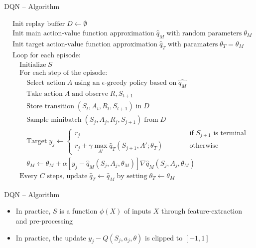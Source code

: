 \documentclass[ignorenonframetext,xcolor=x11names]{beamer}
\begin{document}
\begin{frame}{DQN -- Algorithm}
\footnotesize
\begin{block}{}
\vspace{-\baselineskip}
\begin{align*}
& \text{Init replay buffer}\;D \leftarrow \emptyset \\
& \text{Init main action-value function approximation}\;\hat{q}_M\;\text{with random parameters}\;\theta_M \\
& \text{Init target action-value function approximation}\;\hat{q}_T\;\text{with paramaters}\;\theta_T=\theta_M \\
& \text{Loop for each episode:}\\
& \quad \text{Initialize}\;S \\
& \quad \text{For each step of the episode:} \\
& \quad \quad \text{Select action}\; A \; \text{using an} \; \text{$\epsilon$-greedy policy based on}\; \hat{q_M}\\
& \quad \quad \text{Take action} \; A \; \text{and observe}\;R, S_{t+1} \\
& \quad \quad \text{Store transition} \; (S_t , A_t , R_t , S_{t+1} ) \; \text{in} \; D \\
& \quad \quad \text{Sample minibatch} \; (S_j , A_j , R_j , S_{j+1} ) \; \text{from} \; D \\
& \quad \quad \text{Target}\;y_j \leftarrow \begin{cases} r_j & \qquad \quad \text{if $S_{j+1}$ is terminal} \\
r_j + \gamma \max_{A'} \hat{q}_T(S_{j+1}, A'; \theta_T) & \qquad \quad \text{otherwise}\end{cases} \\
& \quad \quad \theta_M \leftarrow \theta_M + \alpha [y_j - \hat{q}_M (S_j, A_j, \theta_M)] \nabla \hat{q}_M(S_j, A_j, \theta_M) \hspace{1in} \\
& \quad \text{Every $C$ steps, update}\; \hat{q}_T \leftarrow \hat{q}_M\;\text{by setting}\; \theta_T \leftarrow \theta_M
\end{align*}
\vspace{-\baselineskip}
\end{block}
\end{frame}

\begin{frame}{DQN -- Algorithm}
\begin{itemize}
   \item In practice, $S$ is a function $\phi(X)$ of inputs $X$ through feature-extraction and pre-processing
   \item In practice, the update $y_j - Q(S_j, a_j, \theta)$ is clipped to $[-1, 1]$
   \end{itemize}
\end{frame}
\end{document}
